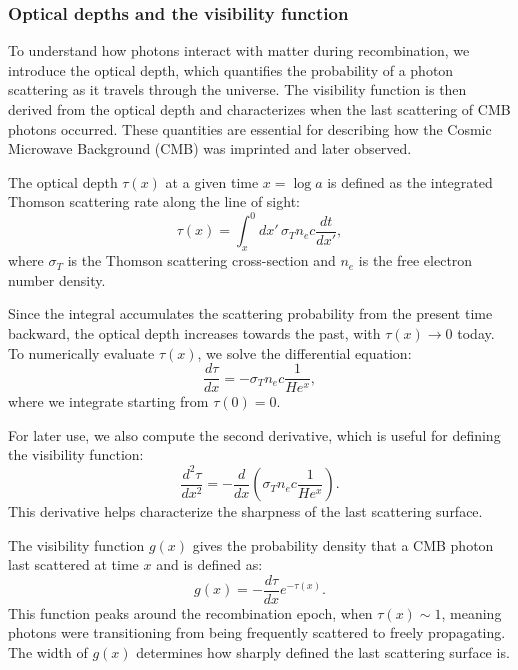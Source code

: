 \documentclass{aa}
\begin{document}
\subsubsection{Optical depths and the visibility function}
\color{Plum}
To understand how photons interact with matter during recombination, we introduce the optical depth, which quantifies the probability of a photon scattering as it travels through the universe. The visibility function is then derived from the optical depth and characterizes when the last scattering of CMB photons occurred. These quantities are essential for describing how the Cosmic Microwave Background (CMB) was imprinted and later observed.

The optical depth $\tau(x)$ at a given time $x = \log a$ is defined as the integrated Thomson scattering rate along the line of sight:
\begin{equation}
\tau(x) = \int_x^0 dx' \, \sigma_T n_e c \frac{dt}{dx'},
\end{equation}
where $\sigma_T$ is the Thomson scattering cross-section and $n_e$ is the free electron number density.

Since the integral accumulates the scattering probability from the present time backward, the optical depth increases towards the past, with $\tau(x) \to 0$ today. To numerically evaluate $\tau(x)$, we solve the differential equation:
\begin{equation}
\frac{d\tau}{dx} = -\sigma_T n_e c \frac{1}{H e^x},
\end{equation}
where we integrate starting from $\tau(0) = 0$.

For later use, we also compute the second derivative, which is useful for defining the visibility function:
\begin{equation}
\frac{d^2 \tau}{dx^2} = -\frac{d}{dx} \left( \sigma_T n_e c \frac{1}{H e^x} \right).
\end{equation}
This derivative helps characterize the sharpness of the last scattering surface.

The visibility function $g(x)$ gives the probability density that a CMB photon last scattered at time $x$ and is defined as:
\begin{equation}
g(x) = -\frac{d\tau}{dx} e^{-\tau(x)}.
\end{equation}
This function peaks around the recombination epoch, when $\tau(x) \sim 1$, meaning photons were transitioning from being frequently scattered to freely propagating. The width of $g(x)$ determines how sharply defined the last scattering surface is.
\end{document}
